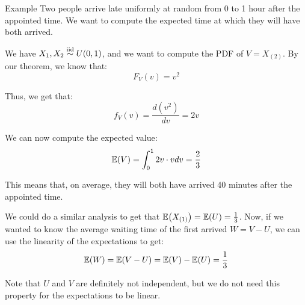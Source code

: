 \documentclass[a4paper]{article}
\begin{document}
\begin{parag}{Example}
    Two people arrive late uniformly at random from 0 to 1 hour after the appointed time. We want to compute the expected time at which they will have both arrived.

    We have $X_1, X_2 \iid U\left(0, 1\right)$, and we want to compute the PDF of $V = X_{\left(2\right)}$. By our theorem, we know that: 
    \[F_{V}\left(v\right) = v^2\]
    
    Thus, we get that: 
    \[f_V\left(v\right) = \frac{d\left(v^2\right)}{dv} = 2v\]
    
    We can now compute the expected value: 
    \[\exval\left(V\right) = \int_{0}^{1} 2v \cdot v dv = \frac{2}{3}\]

    This means that, on average, they will both have arrived 40 minutes after the appointed time.

    We could do a similar analysis to get that $\exval\left(X_{\left(1\right)}\right) = \exval\left(U\right) = \frac{1}{3}$. Now, if we wanted to know the average waiting time of the first arrived $W = V - U$, we can use the linearity of the expectations to get: 
    \[\exval\left(W\right) = \exval\left(V - U\right) = \exval\left(V\right) - \exval\left(U\right) = \frac{1}{3}\]
    
    Note that $U$ and $V$ are definitely not independent, but we do not need this property for the expectations to be linear.
\end{parag}
\end{document}
